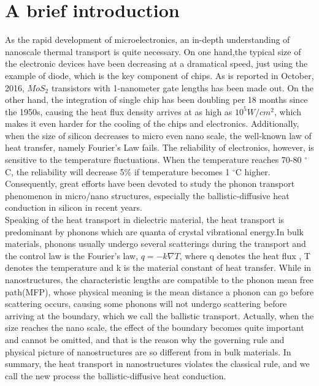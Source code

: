 \section[Introduction]{A brief introduction}
As the rapid development of microelectronics, an in-depth understanding of nanoscale thermal transport is quite necessary\cite{Dames,hua2}. On one hand,the typical size of the electronic devices have been decreasing at a dramatical speed, just using the example of diode, which is the key component of chips. As is reported in October, 2016, $MoS_2$ transistors with 1-nanometer
gate lengths has been made out\cite{Desai}. On the other hand, the integration of single chip has been doubling per 18 months since the 1950s, causing the heat flux density arrives at as high as $10^5W/cm^2$, which makes it even harder for the cooling of the chips and electronics. Additionally, when the size of silicon decreases to micro even nano scale, the well-known law of heat transfer, namely Fourier's Law fails. The reliability of electronics, however, is sensitive to the temperature fluctuations. When the temperature reaches 70-80 $^\circ$C, the reliability will decrease 5\% if temperature becomes 1 $^\circ$C higher\cite{Flik}. Consequently, great efforts have been devoted to study the phonon transport phenomenon in micro/nano structures, especially the ballistic-diffusive heat conduction in silicon in recent years.\\
\indent Speaking of the heat transport in dielectric material, the heat transport is predominant by phonons which are quanta of crystal vibrational energy\cite{Statisticalmechanics,Ziman}.In bulk materials, phonons usually undergo several scatterings during the transport and the control law is the Fourier's law, $q=-k\nabla T$, where q denotes the heat flux , T denotes the temperature and k is the material constant of heat transfer. While in nanostructures, the characteristic lengths are compatible to the phonon mean free path(MFP), whose physical meaning is the mean distance a phonon can go before scattering occurs, causing some phonons will not undergo scattering before arriving at the boundary, which we call the ballistic transport. Actually, when the size reaches the nano scale, the effect of the boundary becomes quite important and cannot be omitted, and that is the reason why the governing rule and physical picture of nanostructures are so different from in bulk materials. In summary, the heat transport in nanostructures violates the classical rule, and we call the new process the ballistic-diffusive heat conduction.\\
